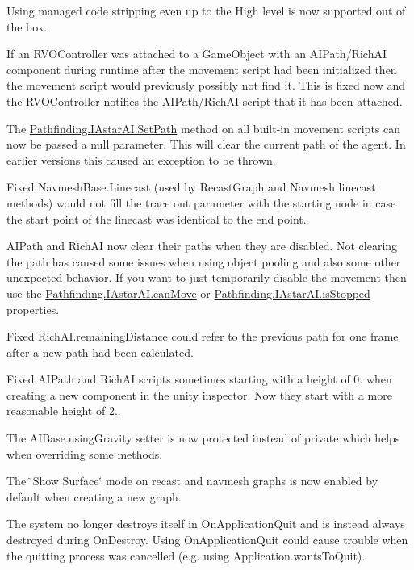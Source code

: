 \begin{DoxyItemize}
\begin{DoxyItemize}
\item Using managed code stripping even up to the High level is now supported out of the box.
\item If an R\+V\+O\+Controller was attached to a Game\+Object with an A\+I\+Path/\+Rich\+AI component during runtime after the movement script had been initialized then the movement script would previously possibly not find it. This is fixed now and the R\+V\+O\+Controller notifies the A\+I\+Path/\+Rich\+AI script that it has been attached.
\item The \mbox{\hyperlink{interface_pathfinding_1_1_i_astar_a_i_a86eb322f611af919dad08b78e580edf4}{Pathfinding.\+I\+Astar\+A\+I.\+Set\+Path}} method on all built-\/in movement scripts can now be passed a null parameter. This will clear the current path of the agent. In earlier versions this caused an exception to be thrown.
\item Fixed Navmesh\+Base.\+Linecast (used by Recast\+Graph and Navmesh linecast methods) would not fill the trace out parameter with the starting node in case the start point of the linecast was identical to the end point.
\item A\+I\+Path and Rich\+AI now clear their paths when they are disabled. Not clearing the path has caused some issues when using object pooling and also some other unexpected behavior. If you want to just temporarily disable the movement then use the \mbox{\hyperlink{interface_pathfinding_1_1_i_astar_a_i_aafc061b743ad47c8079cc46a0d854866}{Pathfinding.\+I\+Astar\+A\+I.\+can\+Move}} or \mbox{\hyperlink{interface_pathfinding_1_1_i_astar_a_i_adaf2a74d7f7e08c86987b969431304fb}{Pathfinding.\+I\+Astar\+A\+I.\+is\+Stopped}} properties.
\item Fixed Rich\+A\+I.\+remaining\+Distance could refer to the previous path for one frame after a new path had been calculated.
\item Fixed A\+I\+Path and Rich\+AI scripts sometimes starting with a height of 0. when creating a new component in the unity inspector. Now they start with a more reasonable height of 2..
\item The A\+I\+Base.\+using\+Gravity setter is now protected instead of private which helps when overriding some methods.
\item The \char`\"{}\+Show Surface\char`\"{} mode on recast and navmesh graphs is now enabled by default when creating a new graph.
\item The system no longer destroys itself in On\+Application\+Quit and is instead always destroyed during On\+Destroy. Using On\+Application\+Quit could cause trouble when the quitting process was cancelled (e.\+g. using Application.\+wants\+To\+Quit).

\end{DoxyItemize}
\end{DoxyItemize}
